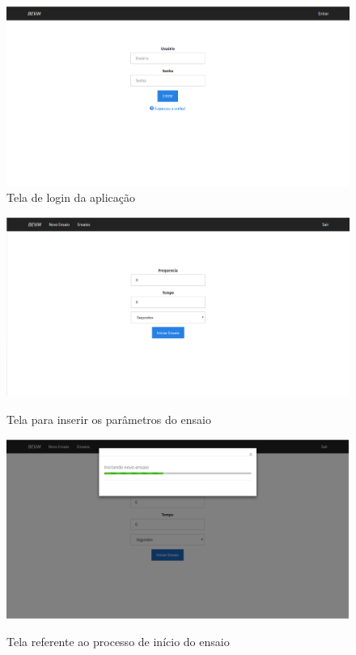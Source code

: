 \begin{figure}[!h]    
\centering
\label{fig:tela_login}	
\includegraphics[keepaspectratio=true,scale=0.55]	{figuras/tela_login.png}
\caption{Tela de login da aplicação}
\end{figure}  

\begin{figure}[!h]    
\centering
\includegraphics[keepaspectratio=true,scale=0.55]	{figuras/tela_iniciar.png}
\label{fig:tela_iniciar}	
\caption{Tela para inserir os parâmetros do ensaio}
\end{figure}  
        
\begin{figure}[!h]    
\centering
\includegraphics[keepaspectratio=true,scale=0.55]	{figuras/tela_iniciando.png}
\label{fig:tela_iniciando}
\caption{Tela referente ao processo de início do ensaio}
\end{figure}  
        
